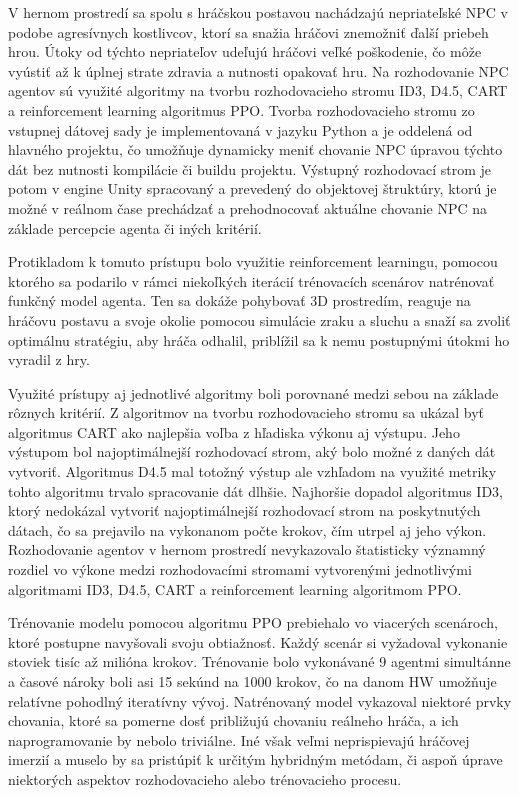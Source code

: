 \documentclass[slovak, master]{diploma}
\begin{document}
V hernom prostredí sa spolu s hráčskou postavou nachádzajú nepriateľské NPC v podobe agresívnych kostlivcov, ktorí sa snažia hráčovi znemožniť ďalší priebeh hrou. Útoky od týchto nepriateľov udeľujú hráčovi veľké poškodenie, čo môže vyústiť až k úplnej strate zdravia a nutnosti opakovať hru. Na rozhodovanie NPC agentov sú využité algoritmy na tvorbu rozhodovacieho stromu ID3, D4.5, CART a reinforcement learning algoritmus PPO. Tvorba rozhodovacieho stromu zo vstupnej dátovej sady je implementovaná v jazyku Python a je oddelená od hlavného projektu, čo umožňuje dynamicky meniť chovanie NPC úpravou týchto dát bez nutnosti kompilácie či buildu projektu. Výstupný rozhodovací strom je potom v engine Unity spracovaný a prevedený do objektovej štruktúry, ktorú je možné v reálnom čase prechádzať a prehodnocovať aktuálne chovanie NPC na základe percepcie agenta či iných kritérií. 

Protikladom k tomuto prístupu bolo využitie reinforcement learningu, pomocou ktorého sa podarilo v rámci niekoľkých iterácií trénovacích scenárov natrénovať funkčný model agenta. Ten sa dokáže pohybovať 3D prostredím, reaguje na hráčovu postavu a svoje okolie pomocou simulácie zraku a sluchu a snaží sa zvoliť optimálnu stratégiu, aby hráča odhalil, priblížil sa k nemu postupnými útokmi ho vyradil z hry.

Využité prístupy aj jednotlivé algoritmy boli porovnané medzi sebou na základe rôznych kritérií. Z algoritmov na tvorbu rozhodovacieho stromu sa ukázal byť algoritmus CART ako najlepšia voľba z hľadiska výkonu aj výstupu. Jeho výstupom bol najoptimálnejší rozhodovací strom, aký bolo možné z daných dát vytvoriť. Algoritmus D4.5 mal totožný výstup ale vzhľadom na využité metriky tohto algoritmu trvalo spracovanie dát dlhšie. Najhoršie dopadol algoritmus ID3, ktorý nedokázal vytvoriť najoptimálnejší rozhodovací strom na poskytnutých dátach, čo sa prejavilo na vykonanom počte krokov, čím utrpel aj jeho výkon. Rozhodovanie agentov v hernom prostredí nevykazovalo štatisticky významný rozdiel vo výkone medzi rozhodovacími stromami vytvorenými jednotlivými algoritmami ID3, D4.5, CART a reinforcement learning algoritmom PPO.

Trénovanie modelu pomocou algoritmu PPO prebiehalo vo viacerých scenároch, ktoré postupne navyšovali svoju obtiažnosť. Každý scenár si vyžadoval vykonanie stoviek tisíc až milióna krokov. Trénovanie bolo vykonávané 9 agentmi simultánne a časové nároky boli asi 15 sekúnd na 1000 krokov, čo na danom HW umožňuje relatívne pohodlný iteratívny vývoj. Natrénovaný model vykazoval niektoré prvky chovania, ktoré sa pomerne dosť približujú chovaniu reálneho hráča, a ich naprogramovanie by nebolo triviálne. Iné však veľmi neprispievajú hráčovej imerzií a muselo by sa pristúpiť k určitým hybridným metódam, či aspoň úprave niektorých aspektov rozhodovacieho alebo trénovacieho procesu. 
\end{document}
